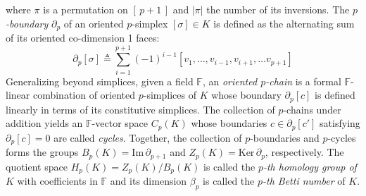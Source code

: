 where $\pi$ is a permutation on $[\,p+1\,]$ and $\lvert \pi \rvert$ the number of its inversions. 
The \emph{$p$-boundary} $\partial_p$ of an oriented $p$-simplex $[\sigma] \in K$ is defined as the alternating sum of its oriented co-dimension 1 faces:
\begin{equation}\label{eq:alt_sum}
	\partial_p[\sigma] \triangleq \sum_{i=1}^{p+1} (-1)^{i-1} [v_1, \dots, v_{i-1}, v_{i+1}, \dots v_{p+1}]
\end{equation}
Generalizing beyond simplices, given a field $\mathbb{F}$, an \emph{oriented $p$-chain} is a formal $\mathbb{F}$-linear combination of oriented $p$-simplices of $K$ whose boundary $\partial_p[c]$ is defined linearly in terms of its constitutive simplices. 
The collection of $p$-chains under addition yields an $\mathbb{F}$-vector space $C_p(K)$ whose boundaries $c \in \partial_p[c']$ satisfying $\partial_p[c] = 0$ are called \emph{cycles}.
 Together, the collection of $p$-boundaries and $p$-cycles forms the groups $B_p(K) = \mathrm{Im}\,\partial_{p+1}$ and $Z_p(K) = \mathrm{Ker}\,\partial_p$, respectively. 
The quotient space $H_p(K) = Z_p(K) / B_{p}(K)$ is 
 called the \emph{$p$-th homology group of $K$} with coefficients in $\mathbb{F}$ and its dimension $\beta_p$ is called the \emph{$p$-th Betti number} of $K$.


